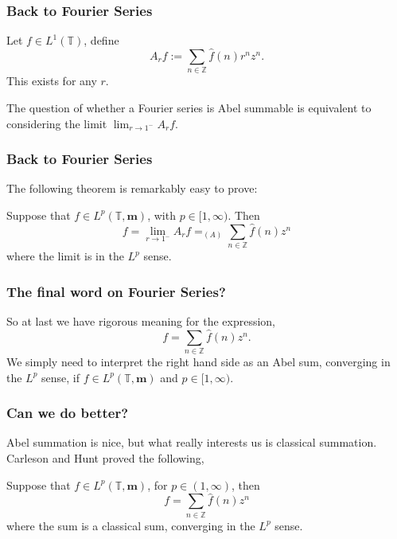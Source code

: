 \documentclass{beamer}
\newcommand{\Circ}{\mathbb{T}}
\newcommand{\Itgr}{\mathbb{Z}}
\newcommand{\ha}{\boldsymbol{m}}
\begin{document}
\begin{frame}
    \frametitle{Back to Fourier Series}
    Let $f \in L^1(\Circ)$, define
    \begin{equation*}
        A_r f := \sum_{n \in \Itgr} \widehat{f}(n) r^nz^n.
    \end{equation*}
    This exists for any $r$.
    
    The question of whether a Fourier series is Abel summable
    is equivalent to considering the limit $\lim_{r\rightarrow 1^-} A_rf$.
\end{frame}

\begin{frame}
    \frametitle{Back to Fourier Series}
    The following theorem is remarkably easy to prove:
    \begin{theorem}
        Suppose that $f \in L^p(\Circ,\ha)$, with $p \in [1,\infty)$. 
        Then
        \begin{equation*}
            f = \lim_{r\rightarrow 1^-} A_r f = _{(A)}\sum_{n \in \Itgr} \widehat{f}(n)z^n
        \end{equation*}
        where the limit is in the $L^p$ sense.
    \end{theorem}
\end{frame}

\begin{frame}
    \frametitle{The final word on Fourier Series?}
    So at last we have rigorous meaning for the expression,
    \begin{equation*}
        f = \sum_{n\in \Itgr}\widehat{f}(n)z^n.
    \end{equation*}
    We simply need to interpret the right hand side as an Abel sum,
    converging in the $L^p$ sense, if $f \in L^p(\Circ,\ha)$ and $p \in [1,\infty)$.
\end{frame}

\begin{frame}
    \frametitle{Can we do better?}
    Abel summation is nice, but what really interests
    us is classical summation. Carleson and Hunt proved the following,
    \begin{theorem}
        Suppose that $f \in L^p(\Circ,\ha)$, for $p \in (1,\infty)$, then
        \begin{equation*}
            f = \sum_{n\in\Itgr} \widehat{f}(n)z^n
        \end{equation*}
        where the sum is a classical sum, converging in the $L^p$ sense.
    \end{theorem}
\end{frame} 
\end{document}
